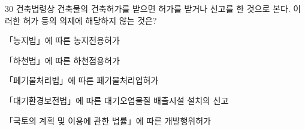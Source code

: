 \begin{question}{30}
건축법령상 건축물의 건축허가를 받으면 허가를 받거나 신고를 한 것으로 본다. 이러한 허가 등의 의제에 해당하지 않는 것은?
\begin{choices}
  \item 「농지법」에 따른 농지전용허가
  \item 「하천법」에 따른 하천점용허가
  \item 「폐기물처리법」에 따른 폐기물처리업허가
  \item 「대기환경보전법」에 따른 대기오염물질 배출시설 설치의 신고
  \item 「국토의 계획 및 이용에 관한 법률」에 따른 개발행위허가
\end{choices}
\end{question}
